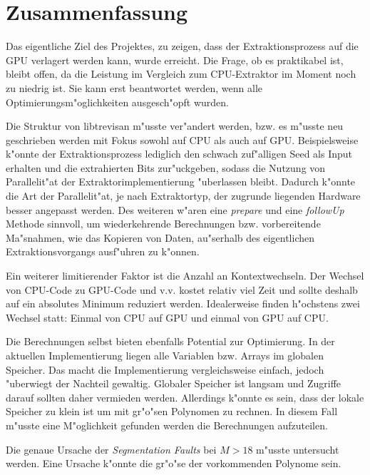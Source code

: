 \section{Zusammenfassung}

Das eigentliche Ziel des Projektes, zu zeigen, dass der Extraktionsprozess auf die GPU verlagert werden kann, wurde erreicht. Die Frage, ob es praktikabel ist, bleibt offen, da die Leistung im Vergleich zum CPU-Extraktor im Moment noch zu niedrig ist. Sie kann erst beantwortet werden, wenn alle Optimierungsm"oglichkeiten ausgesch"opft wurden.

Die Struktur von libtrevisan m"usste ver"andert werden, bzw. es m"usste neu geschrieben werden mit Fokus sowohl auf CPU als auch auf GPU. Beispielsweise k"onnte der Extraktionsprozess lediglich den schwach zuf"alligen Seed als Input erhalten und die extrahierten Bits zur"uckgeben, sodass die Nutzung von Parallelit"at der Extraktorimplementierung "uberlassen bleibt. Dadurch k"onnte die Art der Parallelit"at, je nach Extraktortyp, der zugrunde liegenden Hardware besser angepasst werden. Des weiteren w"aren eine \emph{prepare} und eine \emph{followUp} Methode sinnvoll, um wiederkehrende Berechnungen bzw. vorbereitende Ma"snahmen, wie das Kopieren von Daten, au"serhalb des eigentlichen Extraktionsvorgangs ausf"uhren zu k"onnen.

Ein weiterer limitierender Faktor ist die Anzahl an Kontextwechseln. Der Wechsel von CPU-Code zu GPU-Code und v.v. kostet relativ viel Zeit und sollte deshalb auf ein absolutes Minimum reduziert werden. Idealerweise finden h"ochstens zwei Wechsel statt: Einmal von CPU auf GPU und einmal von GPU auf CPU.

Die Berechnungen selbst bieten ebenfalls Potential zur Optimierung. In der aktuellen Implementierung liegen alle Variablen bzw. Arrays im globalen Speicher. Das macht die Implementierung vergleichsweise einfach, jedoch "uberwiegt der Nachteil gewaltig. Globaler Speicher ist langsam und Zugriffe darauf sollten daher vermieden werden. Allerdings k"onnte es sein, dass der lokale Speicher zu klein ist um mit gr"o"sen Polynomen zu rechnen. In diesem Fall m"usste eine M"oglichkeit gefunden werden die Berechnungen aufzuteilen.

Die genaue Ursache der \emph{Segmentation Faults} bei $M > 18$ m"usste untersucht werden. Eine Ursache k"onnte die gr"o"se der vorkommenden Polynome sein.


